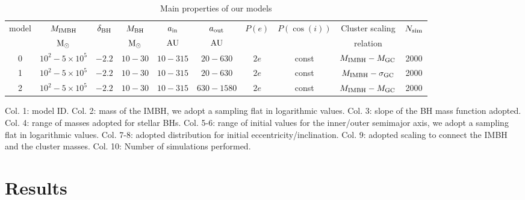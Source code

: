 \documentclass[twocolumn]{aastex62}
\newcommand{\Ms}{{\rm M}_\odot}
\newcommand{\au}{{\rm AU}}
\newcommand{\gc}{{\rm GC}}
\newcommand{\ibh}{{\rm IMBH}}
\newcommand{\inn}{{\rm in}}
\newcommand{\out}{{\rm out}}
\newcommand{\bh}{{\rm BH}}
\begin{document}
\begin{table}
\begin{center}
\caption{Main properties of our models}
\begin{tabular}{cccccccccc}
\hline
model   & $M_\ibh$ & $\delta_\bh$ & $M_\bh$ & $a_\inn$ & $a_\out$ & $P(e)$ &$P(\cos(i))$ &Cluster scaling & $N_{\rm sim}$\\ 
        & $\Ms$    &            & $\Ms$   & $\au$    &  $\au$    &         &  &relation &\\
\hline 
0 & $10^2-5\times 10^5$ & $-2.2$ & $10-30$ & $10-315$ & $20-630$ & $2e$ & const&$M_\ibh -M_\gc$ & 2000\\
1 & $10^2-5\times 10^5$ & $-2.2$ & $10-30$ & $10-315$ & $20-630$ & $2e$ & const&$M_\ibh -\sigma_\gc$ & 2000\\
2 & $10^2-5\times 10^5$ & $-2.2$ & $10-30$ & $10-315$ & $630-1580$ & $2e$ &const &$M_\ibh -M_\gc$ & 2000\\
\hline
\end{tabular}
\begin{tablenotes}
\item Col. 1: model ID. Col. 2: mass of the IMBH, we adopt a sampling flat in logarithmic values. Col. 3: slope of the BH mass function adopted. Col. 4: range of masses adopted for stellar BHs. Col. 5-6: range of initial values for the inner/outer semimajor axis, we adopt a sampling flat in  logarithmic values. Col. 7-8: adopted distribution for initial eccentricity/inclination. Col. 9: adopted scaling to connect the IMBH and the cluster masses. Col. 10: Number of simulations performed.
\end{tablenotes}
\end{center}
\label{tab:t2}
\end{table}



\section{Results}
\label{res}
\end{document}
